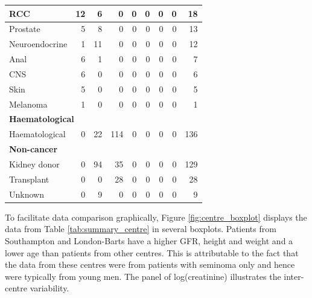 \documentclass[11pt,]{article}
\begin{document}
\begin{table}
{\begin{tabular}[t]{l|r|r|r|r|r|r|r|r}
\hline
\hspace{1em}RCC & 12 & 6 & 0 & 0 & 0 & 0 & 0 & 18\\
\hline
\hspace{1em}Prostate & 5 & 8 & 0 & 0 & 0 & 0 & 0 & 13\\
\hline
\hspace{1em}Neuroendocrine & 1 & 11 & 0 & 0 & 0 & 0 & 0 & 12\\
\hline
\hspace{1em}Anal & 6 & 1 & 0 & 0 & 0 & 0 & 0 & 7\\
\hline
\hspace{1em}CNS & 6 & 0 & 0 & 0 & 0 & 0 & 0 & 6\\
\hline
\hspace{1em}Skin & 5 & 0 & 0 & 0 & 0 & 0 & 0 & 5\\
\hline
\hspace{1em}Melanoma & 1 & 0 & 0 & 0 & 0 & 0 & 0 & 1\\
\hline
\multicolumn{9}{l}{\textbf{Haematological}}\\
\hline
\hspace{1em}Haematological & 0 & 22 & 114 & 0 & 0 & 0 & 0 & 136\\
\hline
\multicolumn{9}{l}{\textbf{Non-cancer}}\\
\hline
\hspace{1em}\hspace{1em}Kidney donor & 0 & 94 & 35 & 0 & 0 & 0 & 0 & 129\\
\hline
\hspace{1em}Transplant & 0 & 0 & 28 & 0 & 0 & 0 & 0 & 28\\
\hline
\hspace{1em}Unknown & 0 & 9 & 0 & 0 & 0 & 0 & 0 & 9\\
\hline
\end{tabular}}
\end{table}

To facilitate data comparison graphically, Figure
\ref{fig:centre_boxplot} displays the data from Table
\ref{tab:summary_centre} in several boxplots. Patients from Southampton
and London-Barts have a higher GFR, height and weight and a lower age
than patients from other centres. This is attributable to the fact that
the data from these centres were from patients with seminoma only and
hence were typically from young men. The panel of log(creatinine)
illustrates the inter-centre variability.
\end{document}
